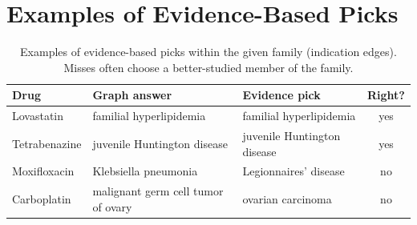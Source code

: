 \documentclass[letterpaper]{article} %
\begin{document}
\section{Examples of Evidence-Based Picks}

\begin{table}[h]
\centering
\small
\setlength{\tabcolsep}{3pt}
\begin{tabular}{>{\raggedright\arraybackslash}p{1.85cm}>{\raggedright\arraybackslash}p{2.35cm}>{\raggedright\arraybackslash}p{2.2cm}c}
\toprule
Drug & Graph answer & Evidence pick & Right? \\
\midrule
Lovastatin & familial hyperlipidemia & familial hyperlipidemia & yes \\
Tetrabenazine & juvenile Huntington disease & juvenile Huntington disease & yes \\
Moxifloxacin & Klebsiella pneumonia & Legionnaires' disease & no \\
Carboplatin & malignant germ cell tumor of ovary & ovarian carcinoma & no \\
\bottomrule
\end{tabular}
\caption{Examples of evidence-based picks within the given family (indication
edges). Misses often choose a better-studied member of the family.}
\label{tab:examples}
\end{table}
\end{document}

